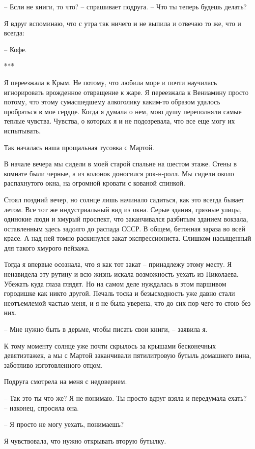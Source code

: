 \documentclass[
]{book}
\begin{document}
-- Если не книги, то что? -- спрашивает подруга. -- Что ты теперь будешь делать?

Я вдруг вспоминаю, что с утра так ничего и не выпила и отвечаю то же, что и всегда:

-- Кофе.

***

Я переезжала в Крым. Не потому, что любила море и почти научилась игнорировать врожденное отвращение к жаре. Я переезжала к Вениамину просто потому, что этому сумасшедшему алкоголику каким-то образом удалось пробраться в мое сердце. Когда я думала о нем, мою душу переполняли самые теплые чувства. Чувства, о которых я и не подозревала, что все еще могу их испытывать.

Так началась наша прощальная тусовка с Мартой.

В начале вечера мы сидели в моей старой спальне на шестом этаже. Стены в комнате были черные, а из колонок доносился рок-н-ролл. Мы сидели около распахнутого окна, на огромной кровати с кованой спинкой.

Стоял поздний вечер, но солнце лишь начинало садиться, как это всегда бывает летом. Все тот же индустриальный вид из окна. Серые здания, грязные улицы, одинокие люди и хмурый проспект, что заканчивался разбитым зданием вокзала, оставленным здесь задолго до распада СССР. В общем, бетонная зараза во всей красе. А над ней томно раскинулся закат экспрессиониста. Слишком насыщенный для такого хмурого пейзажа.

Тогда я впервые осознала, что я как тот закат -- принадлежу этому месту. Я ненавидела эту рутину и всю жизнь искала возможность уехать из Николаева. Убежать куда глаза глядят. Но на самом деле нуждалась в этом паршивом городишке как никто другой. Печаль тоска и безысходность уже давно стали неотъемлемой частью меня, и я не была уверена, что до сих пор чего-то стою без них.

-- Мне нужно быть в дерьме, чтобы писать свои книги, -- заявила я.

К тому моменту солнце уже почти скрылось за крышами бесконечных девятиэтажек, а мы с Мартой заканчивали пятилитровую бутыль домашнего вина, заботливо изготовленного отцом.

Подруга смотрела на меня с недоверием.

-- Так это ты что же? Я не понимаю. Ты просто вдруг взяла и передумала ехать? -- наконец, спросила она.

-- Я просто не могу уехать, понимаешь?

Я чувствовала, что нужно открывать вторую бутылку.
\end{document}
